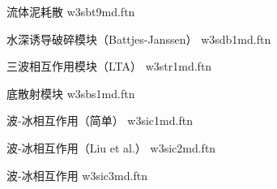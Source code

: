 \begin{flisti}
\end{flisti}

\pb \noindent
流体泥耗散 \citep{art:Ng00}  \hfill {\file w3sbt9md.ftn}

\begin{flisti}
\end{flisti}

\noindent
水深诱导破碎模块（Battjes-Janssen） \hfill {\file w3sdb1md.ftn}

\begin{flisti}
\end{flisti}

\noindent
三波相互作用模块（LTA） \hfill {\file w3str1md.ftn}

\begin{flisti}
\end{flisti}

\noindent
底散射模块 \hfill {\file w3sbs1md.ftn}

\begin{flisti}
\end{flisti}

\pb \noindent
波-冰相互作用（简单） \hfill {\file w3sic1md.ftn}

\begin{flisti}
\end{flisti}

\noindent
波-冰相互作用（Liu et al.） \hfill {\file w3sic2md.ftn}

\begin{flisti}
\end{flisti}

\noindent
波-冰相互作用 \cite{art:WS10} \hfill {\file w3sic3md.ftn}

\begin{flisti}
\end{flisti}

\begin{flisti}
\end{flisti}

